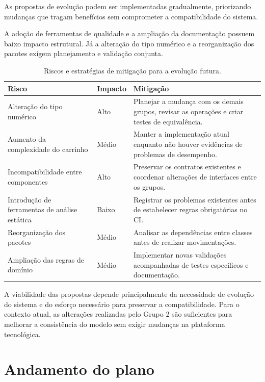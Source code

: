 As propostas de evolução podem ser implementadas gradualmente, priorizando mudanças que tragam benefícios sem comprometer a compatibilidade do sistema.

A adoção de ferramentas de qualidade e a ampliação da documentação possuem baixo impacto estrutural. Já a alteração do tipo numérico e a reorganização dos pacotes exigem planejamento e validação conjunta.

\begin{table}[H]\centering\small
\begin{tabularx}{\textwidth}{>{\raggedright\arraybackslash}p{4.3cm}>{\raggedright\arraybackslash}p{1.8cm}Y}
\toprule
\textbf{Risco} & \textbf{Impacto} & \textbf{Mitigação} \\
\midrule
Alteração do tipo numérico & Alto & Planejar a mudança com os demais grupos, revisar as operações e criar testes de equivalência. \\
\addlinespace
Aumento da complexidade do carrinho & Médio & Manter a implementação atual enquanto não houver evidências de problemas de desempenho. \\
\addlinespace
Incompatibilidade entre componentes & Alto & Preservar os contratos existentes e coordenar alterações de interfaces entre os grupos. \\
\addlinespace
Introdução de ferramentas de análise estática & Baixo & Registrar os problemas existentes antes de estabelecer regras obrigatórias no CI. \\
\addlinespace
Reorganização dos pacotes & Médio & Analisar as dependências entre classes antes de realizar movimentações. \\
\addlinespace
Ampliação das regras de domínio & Médio & Implementar novas validações acompanhadas de testes específicos e documentação. \\
\bottomrule
\end{tabularx}
\caption{Riscos e estratégias de mitigação para a evolução futura.}
\end{table}

A viabilidade das propostas depende principalmente da necessidade de evolução do sistema e do esforço necessário para preservar a compatibilidade. Para o contexto atual, as alterações realizadas pelo Grupo 2 são suficientes para melhorar a consistência do modelo sem exigir mudanças na plataforma tecnológica.

\section{Andamento do plano}

